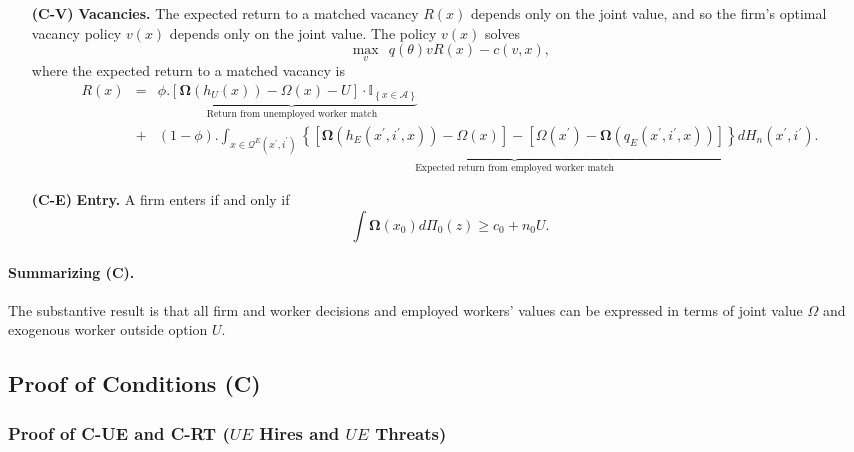 \begin{enumerate}
\item[\textbf{(C-V)}] \textbf{Vacancies.} The expected return to a matched
vacancy $R(x)$ depends only on the joint value, and so the firm's optimal
vacancy policy $v(x)$ depends only on the joint value. The policy $v(x)$
solves
\begin{equation*}
\max_{v}\:\:q(\theta)vR(x)-c\left( v,x\right),
\end{equation*}
where the expected return to a matched vacancy is
\begin{eqnarray*}
R(x) &=& \phi \underbrace{\Big.\left[ \bm{\Omega }\left( h_{U}\left( x\right)
\right) -\Omega \left( x\right) -U\right] \cdot \mathbb{I}_{\left\{ x\in
\mathcal{A}\right\} }}_{\text{Return from unemployed worker match}} \\
&+&\left( 1-\phi \right)\underbrace{\Big.\int_{x\in \mathcal{Q}^{E}\left(
x^{\prime },i^{\prime }\right) }\left\{ \left[ \bm{\Omega }\left(
h_{E}\left( x^{\prime },i^{\prime },x\right) \right) -\Omega \left( x\right) %
\right] -\left[ \Omega \left( x^{\prime }\right) -\bm{\Omega }\left(
q_{E}\left( x^{\prime },i^{\prime },x\right) \right) \right] \right\}
dH_n\left( x^{\prime },i^{\prime }\right)}_{\text{Expected return from
employed worker match}} .
\end{eqnarray*}

\item[\textbf{(C-E)}] \textbf{Entry.} A firm enters if and only if
\begin{equation*}
\int \bm{\Omega }\left( x_{0}\right) d\Pi _{0}(z)\geq c_{0}+n_{0}U.
\end{equation*}
\end{enumerate}

\paragraph{Summarizing (C).}

The substantive result is that all firm and worker decisions and employed
workers' values can be expressed in terms of joint value $\Omega$ and
exogenous worker outside option $U$.

\subsection{Proof of Conditions (C)}

\label{sec:proofC}

\subsubsection{Proof of C-UE and C-RT ($UE$ Hires and $UE$ Threats) \label{ue}}

